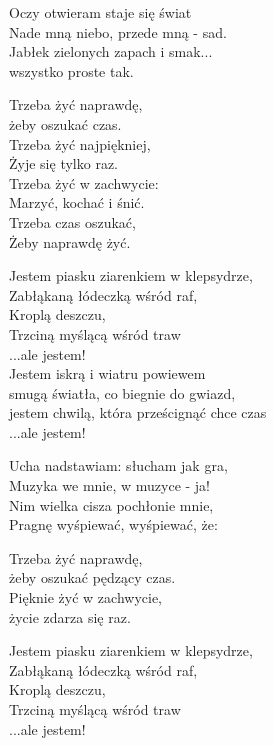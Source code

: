 \begin{text}
    \begin{scriptTwelve}
    Oczy otwieram staje się świat\\
    Nade mną niebo, przede mną - sad.\\
    Jabłek zielonych zapach i smak...\\
    wszystko proste tak.

    Trzeba żyć naprawdę,\\
    żeby oszukać czas.\\
    Trzeba żyć najpiękniej,\\
    Żyje się tylko raz.\\
    Trzeba żyć w zachwycie:\\
    Marzyć, kochać i śnić.\\
    Trzeba czas oszukać,\\
    Żeby naprawdę żyć.

    \vin Jestem piasku ziarenkiem w klepsydrze,\\
    \vin Zabłąkaną łódeczką wśród raf,\\
    \vin Kroplą deszczu,\\
    \vin Trzciną myślącą wśród traw\\
    \vin ...ale jestem!\\
    \vin Jestem iskrą i wiatru powiewem\\
    \vin smugą światła, co biegnie do gwiazd,\\
    \vin jestem chwilą, która prześcignąć chce czas\\
    \vin ...ale jestem!

    Ucha nadstawiam: słucham jak gra,\\
    Muzyka we mnie, w muzyce - ja!\\
    Nim wielka cisza pochłonie mnie,\\
    Pragnę wyśpiewać, wyśpiewać, że:

    Trzeba żyć naprawdę,\\
    żeby oszukać pędzący czas.\\
    Pięknie żyć w zachwycie,\\
    życie zdarza się raz.

    \vin Jestem piasku ziarenkiem w klepsydrze,\\
    \vin Zabłąkaną łódeczką wśród raf,\\
    \vin Kroplą deszczu,\\
    \vin Trzciną myślącą wśród traw\\
    \vin ...ale jestem!


\end{scriptTwelve}
\end{text}
